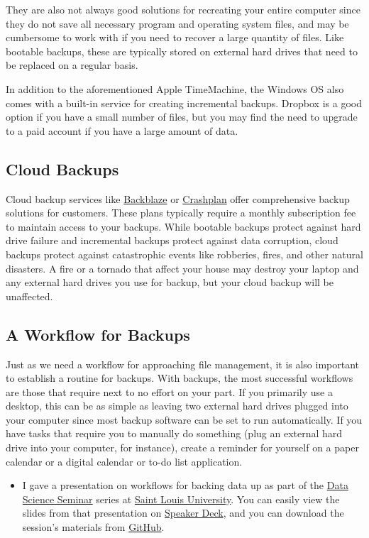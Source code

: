 \documentclass[]{book}
\newenvironment{rmdblock}[1]
  {\begin{shaded*}
  \begin{itemize}
  \renewcommand{\labelitemi}{
    \raisebox{-.7\height}[0pt][0pt]{
      {\setkeys{Gin}{width=3em,keepaspectratio}\texttt{[image: images/\#1]}}
    }
  }
  \item
  }
  {
  \end{itemize}
  \end{shaded*}
  }
\newenvironment{rmdtip}
  {\begin{rmdblock}{tip}}
  {\end{rmdblock}}
\theoremstyle{definition}
\theoremstyle{definition}
\theoremstyle{definition}
\theoremstyle{remark}
\begin{document}
They are also not always good solutions for recreating your entire
computer since they do not save all necessary program and operating
system files, and may be cumbersome to work with if you need to recover
a large quantity of files. Like bootable backups, these are typically
stored on external hard drives that need to be replaced on a regular
basis.

In addition to the aforementioned Apple TimeMachine, the Windows OS also
comes with a built-in service for creating incremental backups. Dropbox
is a good option if you have a small number of files, but you may find
the need to upgrade to a paid account if you have a large amount of
data.

\subsection{Cloud Backups}\label{cloud-backups}

Cloud backup services like \href{https://www.backblaze.com}{Backblaze}
or \href{https://www.code42.com/crashplan/}{Crashplan} offer
comprehensive backup solutions for customers. These plans typically
require a monthly subscription fee to maintain access to your backups.
While bootable backups protect against hard drive failure and
incremental backups protect against data corruption, cloud backups
protect against catastrophic events like robberies, fires, and other
natural disasters. A fire or a tornado that affect your house may
destroy your laptop and any external hard drives you use for backup, but
your cloud backup will be unaffected.

\subsection{A Workflow for Backups}\label{a-workflow-for-backups}

Just as we need a workflow for approaching file management, it is also
important to establish a routine for backups. With backups, the most
successful workflows are those that require next to no effort on your
part. If you primarily use a desktop, this can be as simple as leaving
two external hard drives plugged into your computer since most backup
software can be set to run automatically. If you have tasks that require
you to manually do something (plug an external hard drive into your
computer, for instance), create a reminder for yourself on a paper
calendar or a digital calendar or to-do list application.

\begin{rmdtip}
I gave a presentation on workflows for backing data up as part of the
\href{https://slu-dss.github.io}{Data Science Seminar} series at
\href{https://slu.edu}{Saint Louis University}. You can easily view the
slides from that presentation on
\href{https://speakerdeck.com/chrisprener/protecting-your-data}{Speaker
Deck}, and you can download the session's materials from
\href{https://github.com/slu-dss/protectData}{GitHub}.
\end{rmdtip}
\end{document}
